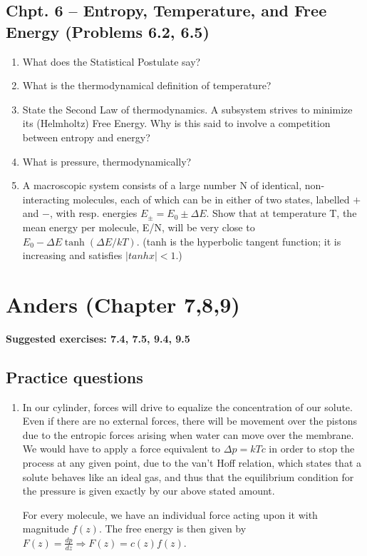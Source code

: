 \documentclass[a4paper,12pt]{article}
\begin{document}
      \subsection{Chpt. 6 – Entropy, Temperature, and Free Energy (Problems 6.2, 6.5)}
         \begin{enumerate}
            \item What does the Statistical Postulate say?
            \item What is the thermodynamical definition of temperature?
            \item State the Second Law of thermodynamics.
                A subsystem strives to minimize its (Helmholtz) Free Energy. Why is this said to
               involve a competition between entropy and energy?
            \item What is pressure, thermodynamically?
            \item A macroscopic system consists of a large number N of identical, non-interacting
               molecules, each of which can be in either of two states, labelled
               $+$ and $-$, with resp.
               energies $E_\pm = E_0 \pm \Delta E$. Show that at temperature T, the mean energy per molecule,
               E/N, will be very close to $E_0 - \Delta E \tanh (\Delta E / kT)$. (tanh is the hyperbolic tangent
               function; it is increasing and satisfies $|tanh x| < 1$.)
         \end{enumerate}



\section{Anders (Chapter 7,8,9)}

\textbf{Suggested exercises: 7.4, 7.5, 9.4, 9.5}
\subsection{Practice questions}
   \begin{enumerate}
      \item In our cylinder, forces will drive to equalize the concentration of
         our solute. Even if there are no external forces, there will be
         movement over the pistons due to the entropic forces arising when water
         can move over the membrane. We would have to apply a force equivalent
         to $\Delta p = kTc$ in order to stop the process at any given point,
         due to the van't Hoff relation, which states that a solute behaves like
         an ideal gas, and thus that the equilibrium condition for the pressure
         is given exactly by our above stated amount. 

         For every molecule, we have an individual force acting upon it with
         magnitude $f(z)$. The free energy is then given by $F(z) =
         \frac{dp}{dz} \Rightarrow F(z) = c(z)f(z)$.
   \end{enumerate}
\end{document}
